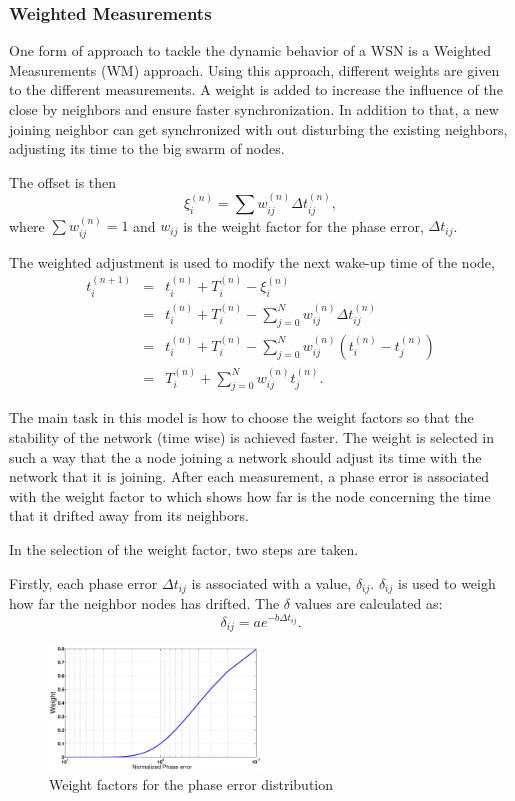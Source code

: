 \documentclass[journal]{IEEEtran}
\begin{document}
\subsubsection{\textbf{Weighted Measurements}}
One form of approach to tackle the dynamic behavior of a WSN is a
Weighted Measurements (WM) approach. Using this approach, different
weights are given to the different measurements. A weight is added to
increase the influence of the close by neighbors and ensure
faster synchronization. In addition to that, a new joining neighbor
can get synchronized with out disturbing the existing neighbors,
adjusting its time to the big swarm of nodes.\par
The offset is then
\begin{equation}
\xi_i^{(n)} = \sum{w_{ij}^{(n)}\Delta t_{ij}^{(n)}} ,
\end{equation}
where $\sum{w_{ij}^{(n)}= 1}$ and $w_{ij}$ is the weight factor for the phase error, $\Delta t_{ij}$.
\par
The weighted adjustment is used to modify the next wake-up time of
the node,
\begin{eqnarray*}
t_i^{(n+1)} &=& t_i^{(n)} + T_i^{(n)} - \xi_i^{(n)} \\ &=& t_i^{(n)}
+ T_i^{(n)} - \sum_{j=0}^N{w_{ij}^{(n)}\Delta t_{ij}^{(n)}} \\ &=&
t_i^{(n)}+ T_i^{(n)} -
\sum_{j=0}^N{w_{ij}^{(n)}(t_i^{(n)}-t_j^{(n)})} \\ &=& T_i^{(n)} + \sum_{j=0}^N{w_{ij}^{(n)}t_j^{(n)}}.
\end{eqnarray*}
\par
The main task in this model is how to choose the weight factors
so that the stability of the network (time wise) is achieved faster. The weight is selected in such a way that the a node
joining a network should adjust its time with the network that it is
joining. After each measurement, a phase error is associated with
the weight  factor to which shows how far is the node concerning the
time that it drifted away from its neighbors.
\par \noindent In the selection of the weight factor, two steps are taken. \par \noindent
Firstly, each phase error $\Delta t_{ij}$ is associated with a value, $\delta_{ij}$. $\delta_{ij}$ is used to weigh how far the neighbor nodes has drifted. The $\delta$ values are calculated as:
\begin{equation}
\delta_{ij} = ae^{-b\Delta t_{ij}}.
\end{equation}
\begin{figure}[t]
\centering
\includegraphics[width= 0.5\textwidth]{weightphase}
\caption{Weight factors for the phase error distribution}
\label{weight}
\end{figure} \noindent
\end{document}
